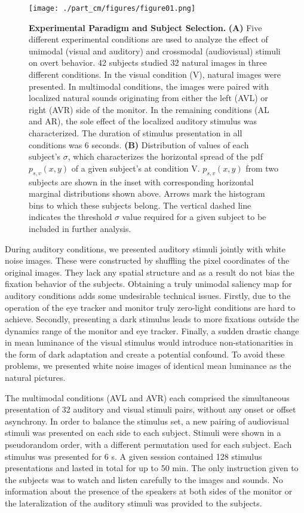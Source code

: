 \begin{figure}[!htbp] \centerline{
\texttt{[image: ./part\_cm/figures/figure01.png]}} 

\caption[Experimental Paradigm and Subject Selection.]{
\textbf{Experimental Paradigm and Subject Selection.} \textbf{(A)} Five
different experimental conditions are used to analyze the effect of
unimodal (visual and auditory) and crossmodal (audiovisual) stimuli on
overt behavior. 42 subjects studied 32 natural images in three different
conditions. In the visual condition (V), natural images were presented. In
multimodal conditions, the images were paired with localized natural sounds
originating from either the left (AVL) or right (AVR) side of the monitor.
In the remaining conditions (AL and AR), the sole effect of the localized
auditory stimulus was characterized. The duration of stimulus presentation
in all conditions was 6 seconds. \textbf{(B)} Distribution of values of
each subject's $\sigma$, which characterizes the horizontal spread of the
pdf $p_{s,v}(x,y)$ of a given subject's at condition V. $p_{s,v}(x,y)$ from
two subjects are shown in the inset with corresponding horizontal marginal
distributions shown above. Arrows mark the histogram bins to which these
subjects belong. The vertical dashed line indicates the threshold $\sigma$
value required for a given subject to be included in further analysis.}
\label{fig1}
\end{figure}


During auditory conditions, we presented auditory stimuli jointly with
white noise images. These were constructed by shuffling the pixel
coordinates of the original images. They lack any spatial structure and as
a result do not bias the fixation behavior of the subjects. Obtaining a
truly unimodal saliency map for auditory conditions adds some undesirable
technical issues. Firstly, due to the operation of the eye tracker and
monitor truly zero-light conditions are hard to achieve. Secondly,
presenting a dark stimulus leads to more fixations outside the dynamics
range of the monitor and eye tracker. Finally, a sudden drastic change in
mean luminance of the visual stimulus would introduce non-stationarities in
the form of dark adaptation and create a potential confound. To avoid these
problems, we presented white noise images of identical mean luminance as
the natural pictures.

The multimodal conditions (AVL and AVR) each comprised the simultaneous
presentation of 32 auditory and visual stimuli pairs, without any onset or
offset asynchrony. In order to balance the stimulus set, a new pairing of
audiovisual stimuli was presented on each side to each subject. Stimuli
were shown in a pseudorandom order, with a different permutation used for
each subject. Each stimulus was presented for 6 s. A given session
contained 128 stimulus presentations and lasted in total for up to 50 min.
The only instruction given to the subjects was to watch and listen
carefully to the images and sounds. No information about the presence of
the speakers at both sides of the monitor or the lateralization of the
auditory stimuli was provided to the subjects.

